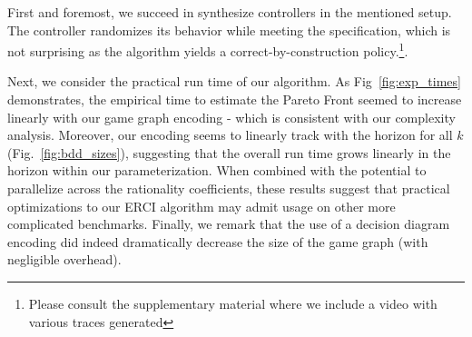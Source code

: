 
First and foremost, we succeed in synthesize controllers in the
mentioned setup.  The controller randomizes its behavior while meeting
the specification, which is not surprising as the algorithm yields a
correct-by-construction policy.\footnote{Please consult the
supplementary material where we include a video with various traces
generated}.

Next, we consider the practical run time of our algorithm.  As
Fig~\ref{fig:exp_times} demonstrates, the empirical time to estimate
the Pareto Front seemed to increase linearly with our game graph
encoding - which is consistent with our complexity analysis.
Moreover, our encoding seems to linearly track with the horizon for
all $k$ (Fig.~\ref{fig:bdd_sizes}), suggesting that the overall run
time grows linearly in the horizon within our parameterization. When
combined with the potential to parallelize across the rationality
coefficients, these results suggest that practical optimizations to
our ERCI algorithm may admit usage on other more complicated
benchmarks. Finally, we remark that the use of a decision diagram
encoding did indeed dramatically decrease the size of the game graph
(with negligible overhead).\footnotemark







